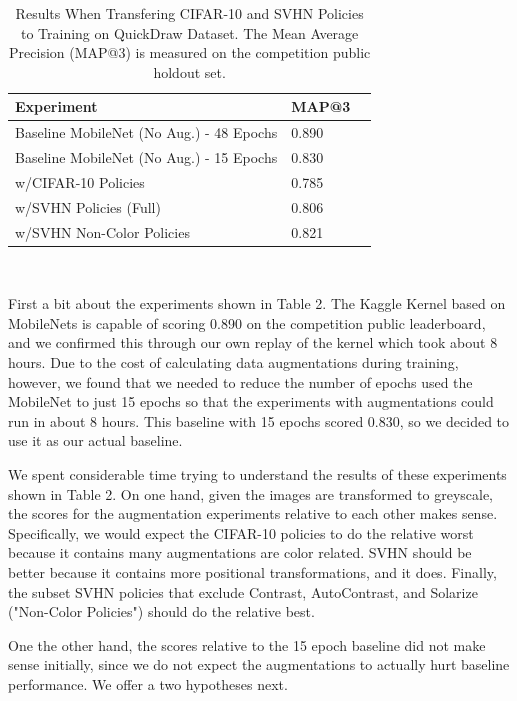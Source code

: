 \documentclass[10pt,twocolumn,letterpaper]{article}
\begin{document}
    \begin{table}[h]
      \begin{tabular}{lll}
        \hline
        Experiment &MAP@3    \\ \hline
        Baseline MobileNet (No Aug.) - 48 Epochs  &0.890 \\
        Baseline MobileNet (No Aug.) - 15 Epochs  &0.830 \\        
        w/CIFAR-10 Policies &0.785  \\
        w/SVHN Policies (Full) &0.806  \\
        w/SVHN Non-Color Policies &0.821  \\  
        \hline
      \end{tabular}
      \\
      \caption{Results When Transfering CIFAR-10 and SVHN Policies to Training on QuickDraw Dataset.  The Mean Average Precision (MAP@3) is measured on the competition public holdout set.}
    \end{table}



First a bit about the experiments shown in Table 2.  The Kaggle Kernel based on MobileNets is capable of scoring 0.890 on the competition public leaderboard, and we confirmed this through our own replay of the kernel which took about 8 hours.  Due to the cost of calculating data augmentations during training, however, we found that we needed to reduce the number of epochs used the MobileNet to just 15 epochs so that the experiments with augmentations could run in about 8 hours.  This baseline with 15 epochs scored 0.830, so we decided to use it as our actual baseline.

We spent considerable time trying to understand the results of these experiments shown in Table 2.  On one hand, given the images are transformed to greyscale, the scores for the augmentation experiments relative to each other makes sense.  Specifically, we would expect the CIFAR-10 policies to do the relative worst because it contains many augmentations are color related.  SVHN should be better because it contains more positional transformations, and it does.  Finally, the subset SVHN policies that exclude Contrast, AutoContrast, and Solarize ("Non-Color Policies") should do the relative best.

One the other hand, the scores relative to the 15 epoch baseline did not make sense initially, since we do not expect the augmentations to actually hurt baseline performance.  We offer a two hypotheses next.  
\end{document}
